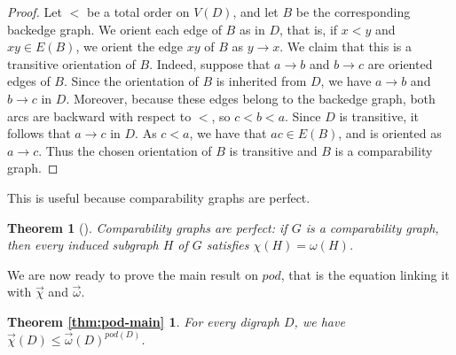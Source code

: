 \documentclass{article}
\newcommand{\dic}{\vec\chi}
\newcommand{\diomega}{\vec\omega}
\renewcommand{\le}{\leqslant}
\newtheorem{theorem}[lemma]{Theorem}
\begin{document}
\begin{proof}
Let $<$ be a total order on $V(D)$, and let $B$ be the corresponding backedge graph.
We orient each edge of $B$ as in $D$, that is, if $x<y$ and $xy\in E(B)$, we orient the edge $xy$ of $B$ as $y \to x$. 
We claim that this is a transitive orientation of $B$.
Indeed, suppose that $a \to b$ and $b \to c$ are oriented edges of $B$.
Since the orientation of $B$ is inherited from $D$, we have $a \to b$ and $b \to c$ in $D$.
Moreover, because these edges belong to the backedge graph, both arcs are backward with respect to $<$, so $c<b<a$.
Since $D$ is transitive, it follows that $a \to c$ in $D$.
As $c<a$, %
we have that $ac\in E(B)$, and is oriented as $a \to c$. 
Thus the chosen orientation of $B$ is transitive and $B$ is a comparability graph.
\end{proof}


This is useful because comparability graphs are perfect.

\begin{theorem}[\cite{berge}]
\label{thm:compareperfect}
    Comparability graphs are perfect: if $G$ is a comparability graph, then every induced subgraph $H$ of $G$ satisfies $\chi(H)=\omega(H)$.
\end{theorem}

We are now ready to prove the main result on $pod$, that is the equation linking it with $\dic$ and $\diomega$. 

\newtheorem*{thm:pod-main}{Theorem \ref{thm:pod-main}}
\begin{thm:pod-main}
For every digraph $D$, we have $\dic(D)\le \diomega(D)^{pod(D)}$.
\end{thm:pod-main}
\end{document}
